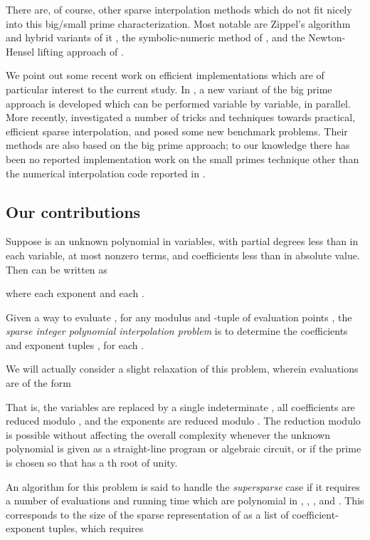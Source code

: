 \documentclass[letterpaper,10pt]{article}
\def\cite{\citep}
\begin{document}
There are, of course, other sparse interpolation methods which do not
fit nicely into this big/small prime characterization. Most notable are
Zippel's algorithm and hybrid variants of it \cite{Zip90,KL03}, the
symbolic-numeric method of \cite{Man95}, and the Newton-Hensel
lifting approach of \cite{AKP06}.

We point out some recent work on efficient implementations which are of
particular interest to the current study. In \cite{JM10}, a new variant
of the big prime approach is developed which can be performed variable
by variable, in parallel. More recently, \cite{HL15} investigated a
number of tricks and techniques towards practical, efficient sparse
interpolation, and posed some new benchmark problems. Their methods are
also based on the big prime approach; to our knowledge there has been no
reported implementation work on the small primes technique other than
the numerical interpolation code reported in \cite{GR11a}.

\subsection{Our contributions}

Suppose  is an unknown polynomial in 
variables, with partial degrees less than  in each variable,
at most  nonzero terms, and coefficients less than  in absolute
value. Then  can be written as

where each exponent  and each .

Given a way to evaluate , for any
modulus  and -tuple of evaluation points
,
the \emph{sparse integer polynomial interpolation problem} is to
determine the coefficients  and exponent tuples 
, for each .

We will actually consider a slight relaxation of this problem, wherein
evaluations are of the form

That is, the  variables are replaced by a single indeterminate ,
all coefficients are reduced modulo , and the exponents are
reduced modulo . The reduction modulo  
is possible without affecting the overall
complexity whenever the unknown polynomial  is given as a
straight-line program or algebraic circuit, or if the prime  is
chosen so that  has a th root of unity.

An algorithm for this problem is said to handle the \emph{supersparse} case
if it requires a number of evaluations and running time which are
polynomial in , , , and . This corresponds to the size of
the sparse representation of  as a list of coefficient-exponent
tuples, which requires
\end{document}
